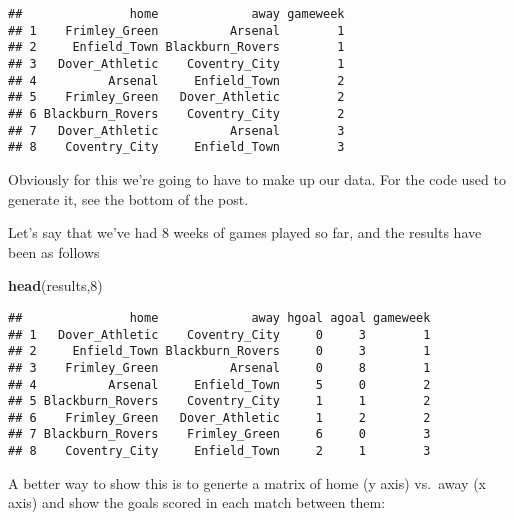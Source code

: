 \documentclass[]{article}
\newenvironment{Shaded}{\begin{snugshade}}{\end{snugshade}}
\newcommand{\KeywordTok}[1]{\textcolor[rgb]{0.13,0.29,0.53}{\textbf{#1}}}
\newcommand{\DecValTok}[1]{\textcolor[rgb]{0.00,0.00,0.81}{#1}}
\newcommand{\NormalTok}[1]{#1}
\begin{document}
\begin{verbatim}
##               home             away gameweek
## 1    Frimley_Green          Arsenal        1
## 2     Enfield_Town Blackburn_Rovers        1
## 3   Dover_Athletic    Coventry_City        1
## 4          Arsenal     Enfield_Town        2
## 5    Frimley_Green   Dover_Athletic        2
## 6 Blackburn_Rovers    Coventry_City        2
## 7   Dover_Athletic          Arsenal        3
## 8    Coventry_City     Enfield_Town        3
\end{verbatim}

Obviously for this we're going to have to make up our data. For the code
used to generate it, see the bottom of the post.

Let's say that we've had 8 weeks of games played so far, and the results
have been as follows

\begin{Shaded}
\begin{Highlighting}[]
\KeywordTok{head}\NormalTok{(results,}\DecValTok{8}\NormalTok{)}
\end{Highlighting}
\end{Shaded}

\begin{verbatim}
##               home             away hgoal agoal gameweek
## 1   Dover_Athletic    Coventry_City     0     3        1
## 2     Enfield_Town Blackburn_Rovers     0     3        1
## 3    Frimley_Green          Arsenal     0     8        1
## 4          Arsenal     Enfield_Town     5     0        2
## 5 Blackburn_Rovers    Coventry_City     1     1        2
## 6    Frimley_Green   Dover_Athletic     1     2        2
## 7 Blackburn_Rovers    Frimley_Green     6     0        3
## 8    Coventry_City     Enfield_Town     2     1        3
\end{verbatim}

A better way to show this is to generte a matrix of home (y axis)
vs.~away (x axis) and show the goals scored in each match between them:
\end{document}
